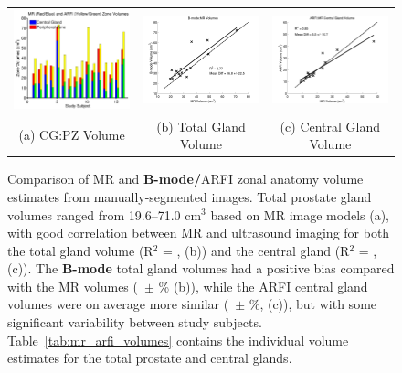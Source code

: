 \begin{figure}
\centering
\begin{tabular}{ccc}
\includegraphics[width=0.3\linewidth]{figs/mr_arfi_volumes} &
\includegraphics[width=0.3\linewidth]{figs/mr_arfi_total_linreg} &
\includegraphics[width=0.3\linewidth]{figs/mr_arfi_central_linreg} \\
(a) CG:PZ Volume & (b) Total Gland Volume & (c) Central Gland Volume \\
\end{tabular}
\caption{Comparison of MR and \textbf{B-mode/}ARFI zonal anatomy volume
    estimates from manually-segmented images.  Total prostate gland volumes
    ranged from 19.6--71.0 cm$^3$ based on MR image models (a), with good
    correlation between MR and ultrasound imaging for both the total gland
    volume (R$^2$ = \MRarfiVolTotalRsq, (b)) and the central gland (R$^2$ =
    \MRarfiVolCentralRsq, (c)).  The \textbf{B-mode} total gland volumes had a
    positive bias compared with the MR volumes (\MRarfiVolTotalMeanDiff~$\pm$
    \MRarfiVolTotalStdDiff\% (b)), while the ARFI central gland volumes were on
    average more similar (\MRarfiVolCentralMeanDiff~$\pm$
    \MRarfiVolCentralStdDiff\%, (c)), but with some significant variability
    between study subjects.  Table~\ref{tab:mr_arfi_volumes} contains the
    individual volume estimates for the total prostate and central glands.}
\label{fig:mr_arfi_volumes} 
\end{figure}
